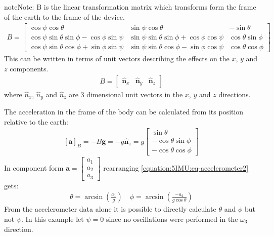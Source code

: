 \documentclass[letterpaper,10pt,english]{jupyterBook}
\begin{document}
\begin{sphinxadmonition}{note}{Note:}
\sphinxAtStartPar
B is the linear transformation matrix which transforms form the frame of the earth to the frame of the device.
\begin{equation*}
\begin{split}B = \begin{bmatrix}
\cos \psi \cos \theta & \sin \psi \cos \theta & -\sin \theta \\
\cos \psi \sin \theta \sin \phi - \cos \phi \sin \psi & \sin \psi \sin \theta \sin \phi + \cos \phi \cos \psi & \cos \theta \sin \phi \\
\cos \psi \sin \theta \cos \phi + \sin \phi \sin \psi & \sin \psi \sin \theta \cos \phi - \sin \phi \cos \psi & \cos \theta \cos \phi
\end{bmatrix} \end{split}
\end{equation*}
\sphinxAtStartPar
This can be written in terms of unit vectors describing the effects on the \(x\), \(y\) and \(z\) components.
\begin{equation*}
\begin{split}B = \begin{bmatrix} \hat{\boldsymbol{n}}_x & \hat{\boldsymbol{n}}_y & \hat{\boldsymbol{n}}_z \end{bmatrix}\end{split}
\end{equation*}
\sphinxAtStartPar
where \(\hat{n}_x\), \(\hat{n}_y\) and \(\hat{n}_z\) are 3 dimensional unit vectors in the \(x\), \(y\) and \(z\) directions.
\end{sphinxadmonition}

\sphinxAtStartPar
The acceleration in the frame of the body can be calculated from its position relative to the earth:
\begin{equation}\label{equation:5IMU:eq-accelerometer2}
\begin{split}[\boldsymbol{a}]_B = - B\boldsymbol{g}  = - g \hat{\boldsymbol{n}}_z = g \begin{bmatrix} \sin{\theta} \\ -\cos{\theta}\sin{\phi} \\ -\cos{\theta}\cos{\phi} \end{bmatrix}\end{split}
\end{equation}
\sphinxAtStartPar
In component form \(\boldsymbol{a} = \begin{bmatrix} a_1 \\ a_2 \\ a_3 \end{bmatrix}\) rearranging \eqref{equation:5IMU:eq-accelerometer2} gets:
\begin{equation}\label{equation:5IMU:accelerometer3}
\begin{split}\theta = \arcsin(\frac{a_1}{g}) \quad \phi = \arcsin(\frac{-a_2}{g\cos{\theta}})\end{split}
\end{equation}
\sphinxAtStartPar
From the accelerometer data alone it is possible to directly calculate \(\theta\) and \(\phi\) but not \(\psi\). In this example let \(\psi = 0\) since no oscillations were performed in the \(\omega_3\) direction.
\end{document}
